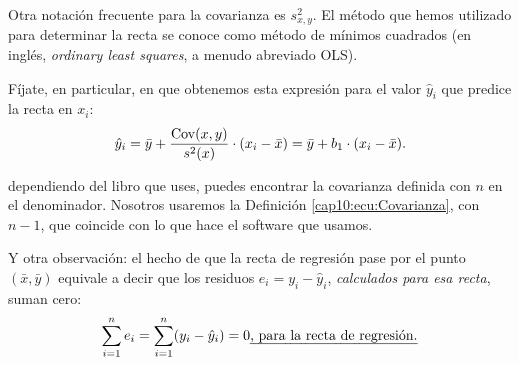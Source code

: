 Otra notación frecuente para la covarianza es $s^2_{x,y}$. El método que hemos utilizado para determinar la recta se conoce como {\sf método de mínimos cuadrados} (en inglés, {\em ordinary least squares}, a menudo abreviado {\sf OLS}).

\noindent Fíjate, en particular, en que obtenemos esta expresión para el valor $\hat y_i$ que predice la recta en $x_i$:
\begin{equation}\label{cap10:ecu:ValorPrediceRectaRegresion}
\hat y_i=
\bar y + \dfrac{\mathrm{Cov}(x,y)}{s^2(x)}\cdot (x_i-\bar x) =
\bar y + b_1\cdot (x_i-\bar x).
\end{equation}

 dependiendo del libro que uses, puedes encontrar la covarianza definida con $n$ en el denominador. Nosotros usaremos la Definición \ref{cap10:ecu:Covarianza}, con $n-1$, que coincide con lo que hace el software que usamos.

Y otra observación: el hecho de que la recta de regresión pase por el punto $(\bar x, \bar y)$  equivale a
decir que los residuos $e_i=y_i-\hat y_i$, {\em calculados para esa recta}, suman cero:
\begin{equation}
\label{cap10:ecu:SumaResiduosCeroRectaRegresion}
\sum_{i=1}^n e_i=\sum_{i=1}^n (y_i-\hat y_i)=0 \mbox{\em , para la recta de regresión.}
\end{equation}


